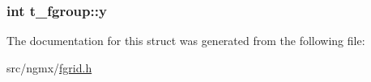\hypertarget{structt__fgroup_a38d462a4d6d4477875d1ed37782da6c9}{
\subsubsection[{y}]{\setlength{\rightskip}{0pt plus 5cm}int {\bf t\-\_\-fgroup\-::y}}}\label{structt__fgroup_a38d462a4d6d4477875d1ed37782da6c9}


\-The documentation for this struct was generated from the following file\-:\begin{DoxyCompactItemize}
\item 
src/ngmx/\hyperlink{fgrid_8h}{fgrid.\-h}\end{DoxyCompactItemize}
